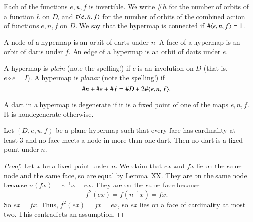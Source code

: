 Each of the functions $e,n,f$ is invertible.  We write $\#h$ for the
number of orbits of a function $h$ on $D$, and $\#\langle e,n,f\rangle$
for the number of orbits of the combined action of functions $e,n,f$
on $D$.  We say that the hypermap is connected if $\#\langle e,n,f\rangle
= 1$.

\begin{definition}  A node of a hypermap is an orbit of darts under
$n$.  A face of a hypermap is an  orbit of darts under $f$.  An edge
of a hypermap is an orbit of darts under $e$.
\end{definition}

\begin{definition} A hypermap is {\it plain} (note the spelling!) if
$e$ is an involution on $D$ (that is, $e\circ e = I$).  A hypermap
is {\it planar} (note the spelling!) if
    $$\# n + \# e + \# f = \# D + 2 \#\langle e,n,f\rangle.$$
\end{definition}

\begin{definition} A dart in a hypermap is degenerate if it is a
fixed point of one of the maps $e,n,f$.  It is nondegenerate
otherwise.
\end{definition}


\begin{lemma}\label{lemma:nondegen} 
Let $(D,e,n,f)$ be a plane hypermap such that every face has
cardinality at least $3$ and no face meets a node in more than one
dart.  Then no dart is a fixed point under $n$.
\end{lemma}

\begin{proof}  Let $x$ be a fixed point under
$n$. We claim that $e x$ and $f x$ lie on the same node and the same
face, so are equal by Lemma~XX.  They are on the same node because
$n(f x) = e^{-1} x = e x$. They are on the same face because
    $$f^2 (e x) =  f(n^{-1} x) = f x.$$
So $e x = f x$.   Thus, $f^2 (e x) = f x = e x$, so $e x$ lies on a
face of cardinality at most two.  This contradicts an assumption.
\end{proof}


